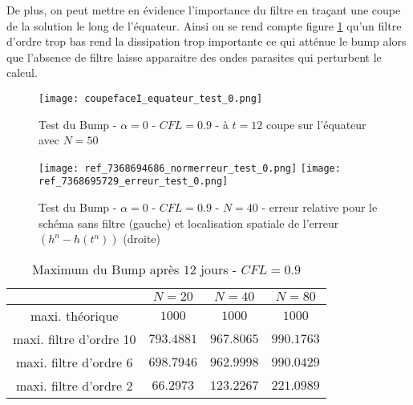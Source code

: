 De plus, on peut mettre en évidence l'importance du filtre en traçant une coupe de la solution le long de l'équateur. Ainsi on se rend compte figure \ref{table adv4} qu'un filtre d'ordre trop bas rend la dissipation trop importante ce qui atténue le bump alors que l'absence de filtre laisse apparaitre des ondes parasites qui perturbent le calcul.


\begin{figure}[ht]
\begin{center}
\texttt{[image: coupefaceI\_equateur\_test\_0.png]}
\caption{Test du Bump - $\alpha = 0$ - $CFL=0.9$ - à $t=12$ coupe sur l'équateur avec $N=50$}
\label{table adv4}
\end{center}
\end{figure}

\begin{figure}[ht]
\begin{center}
\texttt{[image: ref\_7368694686\_normerreur\_test\_0.png]}
\texttt{[image: ref\_7368695729\_erreur\_test\_0.png]}
\caption{Test du Bump - $\alpha = 0$ - $CFL=0.9$ - $N=40$ - erreur relative pour le schéma sans filtre (gauche) et localisation spatiale de l'erreur $( h^n - h(t^n))$ (droite)}
\label{table adv5}
\end{center}
\end{figure}


\begin{table}[ht]
\begin{center}
\begin{tabular}{c|ccc}
\hline
 & $N=20$ &$N=40$ &$N=80$\\
\hline 
\hline
maxi. théorique & $1000$ & $1000$ & $1000$ \\ 
\hline 
maxi. filtre d'ordre 10 & $793.4881$& $967.8065$ & $990.1763$  \\ 
\hline 
maxi. filtre d'ordre 6 & $698.7946$& $962.9998$ & $990.0429$  \\ 
\hline 
maxi. filtre d'ordre 2 & $66.2973$ & $123.2267$ & $221.0989$  \\ 
\hline 
\end{tabular} 
\caption{Maximum du Bump après $12$ jours - $CFL=0.9$}
\end{center}
\end{table}




